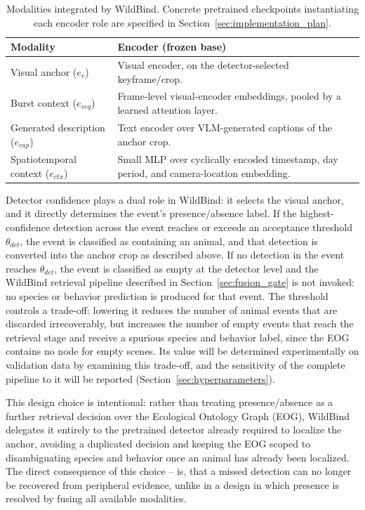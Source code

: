 \begin{table}[htbp]
\centering
\small
\caption{Modalities integrated by WildBind. Concrete pretrained checkpoints instantiating each encoder role are specified in Section~\ref{sec:implementation_plan}.}
\label{tab:wildbind_modalities}
\begin{tabular}{p{2.6cm}p{10.1cm}}
\toprule
\textbf{Modality} & \textbf{Encoder (frozen base)} \\
\midrule
Visual anchor ($e_v$) & Visual encoder, on the detector-selected keyframe/crop. \\

Burst context ($e_{seq}$) & Frame-level visual-encoder embeddings, pooled by a learned attention layer. \\

Generated description ($e_{cap}$) & Text encoder over VLM-generated captions of the anchor crop. \\

Spatiotemporal context ($e_{ctx}$) & Small MLP over cyclically encoded timestamp, day period, and camera-location embedding. \\

\bottomrule
\end{tabular}
\end{table}

Detector confidence plays a dual role in WildBind: it selects the visual anchor, and it directly determines the event's presence/absence label. If the highest-confidence detection across the event reaches or exceeds an acceptance threshold $\theta_{det}$, the event is classified as containing an animal, and that detection is converted into the anchor crop as described above. If no detection in the event reaches $\theta_{det}$, the event is classified as empty at the detector level and the WildBind retrieval pipeline described in Section~\ref{sec:fusion_gate} is not invoked: no species or behavior prediction is produced for that event. The threshold controls a trade-off: lowering it reduces the number of animal events that are discarded irrecoverably, but increases the number of empty events that reach the retrieval stage and receive a spurious species and behavior label, since the EOG contains no node for empty scenes. Its value will be determined experimentally on validation data by examining this trade-off, and the sensitivity of the complete pipeline to it will be reported (Section~\ref{sec:hyperparameters}).

This design choice is intentional: rather than treating presence/absence as a further retrieval decision over the Ecological Ontology Graph (EOG), WildBind delegates it entirely to the pretrained detector already required to localize the anchor, avoiding a duplicated decision and keeping the EOG scoped to disambiguating species and behavior once an animal has already been localized. The direct consequence of this choice -- is, that a missed detection can no longer be recovered from peripheral evidence, unlike in a design in which presence is resolved by fusing all available modalities.

